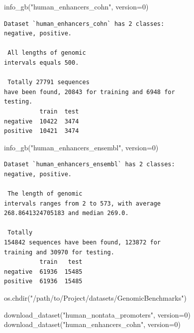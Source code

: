\documentclass[
  letterpaper,
]{article}
\newenvironment{Shaded}{\begin{snugshade}}{\end{snugshade}}
\newcommand{\DecValTok}[1]{\textcolor[rgb]{0.68,0.00,0.00}{#1}}
\newcommand{\NormalTok}[1]{\textcolor[rgb]{0.00,0.23,0.31}{#1}}
\newcommand{\OperatorTok}[1]{\textcolor[rgb]{0.37,0.37,0.37}{#1}}
\newcommand{\StringTok}[1]{\textcolor[rgb]{0.13,0.47,0.30}{#1}}
\begin{document}
\vspace{0.5cm}

\begin{Shaded}
\begin{Highlighting}[]
\NormalTok{info\_gb(}\StringTok{"human\_enhancers\_cohn"}\NormalTok{, version}\OperatorTok{=}\DecValTok{0}\NormalTok{)}
\end{Highlighting}
\end{Shaded}

\begin{verbatim}
Dataset `human_enhancers_cohn` has 2 classes:
negative, positive.

 All lengths of genomic
intervals equals 500.

 Totally 27791 sequences
have been found, 20843 for training and 6948 for
testing.
          train  test
negative  10422  3474
positive  10421  3474
\end{verbatim}

\vspace{0.5cm}

\begin{Shaded}
\begin{Highlighting}[]
\NormalTok{info\_gb(}\StringTok{"human\_enhancers\_ensembl"}\NormalTok{, version}\OperatorTok{=}\DecValTok{0}\NormalTok{)}
\end{Highlighting}
\end{Shaded}

\begin{verbatim}
Dataset `human_enhancers_ensembl` has 2 classes:
negative, positive.

 The length of genomic
intervals ranges from 2 to 573, with average
268.8641324705183 and median 269.0.

 Totally
154842 sequences have been found, 123872 for
training and 30970 for testing.
          train   test
negative  61936  15485
positive  61936  15485
\end{verbatim}

\vspace{0.5cm}

\begin{Shaded}
\begin{Highlighting}[]
\NormalTok{os.chdir(}\StringTok{"/path/to/Project/datasets/GenomicBenchmarks"}\NormalTok{)}

\NormalTok{download\_dataset(}\StringTok{"human\_nontata\_promoters"}\NormalTok{, version}\OperatorTok{=}\DecValTok{0}\NormalTok{) }
\NormalTok{download\_dataset(}\StringTok{"human\_enhancers\_cohn"}\NormalTok{, version}\OperatorTok{=}\DecValTok{0}\NormalTok{) }
\end{Highlighting}
\end{Shaded}
\end{document}

